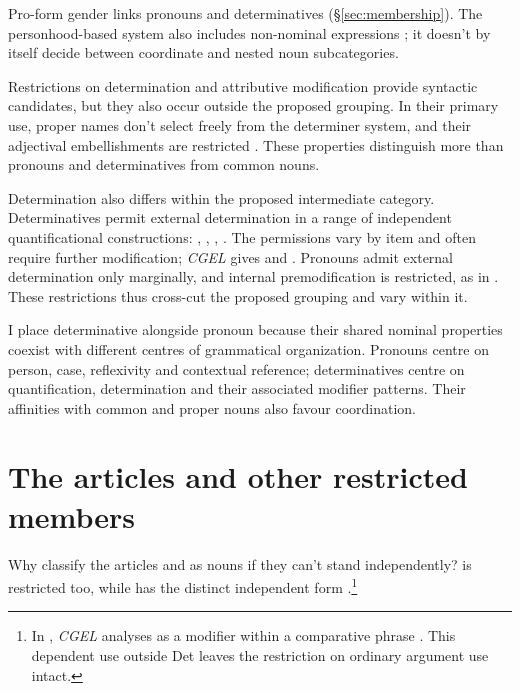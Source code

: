 \documentclass[12pt]{article}
\begin{document}
Pro-form gender links pronouns and determinatives (§\ref{sec:membership}). The personhood-based system also includes non-nominal expressions \citep{reynolds2025proformgender}; it doesn't by itself decide between coordinate and nested noun subcategories.

Restrictions on determination and attributive modification provide syntactic candidates, but they also occur outside the proposed grouping. In their primary use, proper names don't select freely from the determiner system, and their adjectival embellishments are restricted \citep[517, 519--520]{huddleston2002}. These properties distinguish more than pronouns and determinatives from common nouns.

Determination also differs within the proposed intermediate category. Determinatives permit external determination in a range of independent quantificational constructions: , , , . The permissions vary by item and often require further modification; \textit{CGEL} gives  and  \citep[415--416]{huddleston2002}. Pronouns admit external determination only marginally, and internal premodification is restricted, as in  \citep[429--430]{huddleston2002}. These restrictions thus cross-cut the proposed grouping and vary within it.

I place determinative alongside pronoun because their shared nominal properties coexist with different centres of grammatical organization. Pronouns centre on person, case, reflexivity and contextual reference; determinatives centre on quantification, determination and their associated modifier patterns. Their affinities with common and proper nouns also favour coordination.

\section{The articles and other restricted members}\label{sec:articles}

Why classify the articles  and  as nouns if they can't stand independently?  is restricted too, while  has the distinct independent form  \citep[371--372, 410--411]{huddleston2002}.\footnote{In , \textit{CGEL} analyses  as a modifier within a comparative phrase \citep[1131--1132, 1135--1136]{huddleston2002}. This dependent use outside Det leaves the restriction on ordinary argument use intact.}
\end{document}
